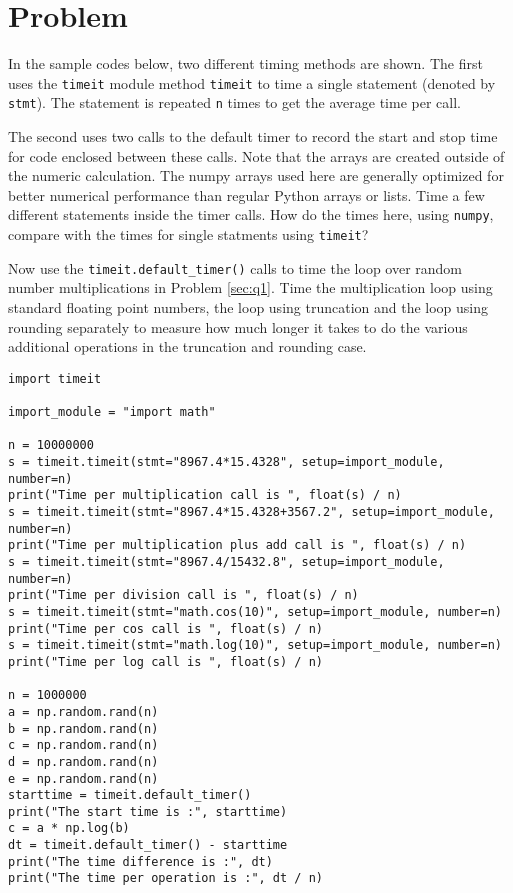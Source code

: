\section{Problem \thesection}

In the sample codes below, two different timing methods are shown. The first uses the
\texttt{timeit} module method \texttt{timeit} to time a single statement (denoted by
\texttt{stmt}). The statement is repeated \texttt{n} times to get the average time per call.

The second uses two calls to the default timer to record the start and stop time for code
enclosed between these calls. Note that the arrays are created outside of the numeric
calculation. The numpy arrays used here are generally optimized for better numerical
performance than regular Python arrays or lists. Time a few different statements inside the
timer calls. How do the times here, using \texttt{numpy}, compare with the times for single
statments using \texttt{timeit}?

Now use the \texttt{timeit.default\_timer()} calls to time the loop over random number
multiplications in Problem \ref{sec:q1}. Time the multiplication loop using standard
floating point numbers, the loop using truncation and the loop using rounding separately to
measure how much longer it takes to do the various additional operations in the truncation
and rounding case.

\begin{verbatim}
import timeit

import_module = "import math"

n = 10000000
s = timeit.timeit(stmt="8967.4*15.4328", setup=import_module, number=n)
print("Time per multiplication call is ", float(s) / n)
s = timeit.timeit(stmt="8967.4*15.4328+3567.2", setup=import_module, number=n)
print("Time per multiplication plus add call is ", float(s) / n)
s = timeit.timeit(stmt="8967.4/15432.8", setup=import_module, number=n)
print("Time per division call is ", float(s) / n)
s = timeit.timeit(stmt="math.cos(10)", setup=import_module, number=n)
print("Time per cos call is ", float(s) / n)
s = timeit.timeit(stmt="math.log(10)", setup=import_module, number=n)
print("Time per log call is ", float(s) / n)

n = 1000000
a = np.random.rand(n)
b = np.random.rand(n)
c = np.random.rand(n)
d = np.random.rand(n)
e = np.random.rand(n)
starttime = timeit.default_timer()
print("The start time is :", starttime)
c = a * np.log(b)
dt = timeit.default_timer() - starttime
print("The time difference is :", dt)
print("The time per operation is :", dt / n)
\end{verbatim}
